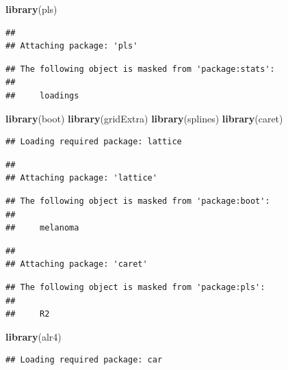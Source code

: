 \documentclass[
]{article}
\newenvironment{Shaded}{\begin{snugshade}}{\end{snugshade}}
\newcommand{\FunctionTok}[1]{\textcolor[rgb]{0.13,0.29,0.53}{\textbf{#1}}}
\newcommand{\NormalTok}[1]{#1}
\begin{document}
\begin{Shaded}
\begin{Highlighting}[]
\FunctionTok{library}\NormalTok{(pls)}
\end{Highlighting}
\end{Shaded}

\begin{verbatim}
## 
## Attaching package: 'pls'
\end{verbatim}

\begin{verbatim}
## The following object is masked from 'package:stats':
## 
##     loadings
\end{verbatim}

\begin{Shaded}
\begin{Highlighting}[]
\FunctionTok{library}\NormalTok{(boot)}
\FunctionTok{library}\NormalTok{(gridExtra)}
\FunctionTok{library}\NormalTok{(splines)}
\FunctionTok{library}\NormalTok{(caret)}
\end{Highlighting}
\end{Shaded}

\begin{verbatim}
## Loading required package: lattice
\end{verbatim}

\begin{verbatim}
## 
## Attaching package: 'lattice'
\end{verbatim}

\begin{verbatim}
## The following object is masked from 'package:boot':
## 
##     melanoma
\end{verbatim}

\begin{verbatim}
## 
## Attaching package: 'caret'
\end{verbatim}

\begin{verbatim}
## The following object is masked from 'package:pls':
## 
##     R2
\end{verbatim}

\begin{Shaded}
\begin{Highlighting}[]
\FunctionTok{library}\NormalTok{(alr4)}
\end{Highlighting}
\end{Shaded}

\begin{verbatim}
## Loading required package: car
\end{verbatim}
\end{document}

